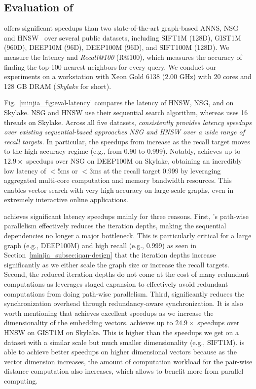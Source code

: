 \subsection{Evaluation of \Hammer}
\label{minjia_subsec:iqan-eval}

\Hammer offers significant speedups than two state-of-the-art graph-based ANNS, NSG~\cite{NSGGithub,nsg} and HNSW~\cite{HNSWGithub,hnsw} over several public datasets, including SIFT1M (128D), GIST1M (960D), DEEP10M (96D), DEEP100M (96D), and SIFT100M (128D). We measure the latency and \emph{Recall@100} (R@100), which measures the accuracy of finding the top-100 nearest neighbors for every query.
We conduct our experiments on a workstation with Xeon Gold 6138 (2.00 GHz) with 20 cores and 128 GB DRAM (\emph{Skylake} for short). 

Fig.~\ref{minjia_fig:eval-latency} compares the latency of HNSW, NSG, and \Hammer on Skylake. NSG and HNSW use their sequential search algorithm, whereas \Hammer uses 16 threads on Skylake. Across all five datasets, \emph{\Hammer consistently provides latency speedups over existing sequential-based approaches NSG and HNSW over a wide range of recall targets. }
In particular, the speedups from \Hammer increase as the recall target moves to the high accuracy regime (e.g., from 0.90 to 0.999).
Notably, \Hammer achieves up to $12.9\times$ speedups over NSG on DEEP100M on Skylake, obtaining an incredibly low latency of $<$5ms or $<$3ms at the recall target 0.999 by leveraging aggregated multi-core computation and memory bandwidth resources. This enables vector search with very high accuracy on large-scale graphs, even in extremely interactive online applications. 

\Hammer achieves significant latency speedups mainly for three reasons. First, \Hammer's path-wise parallelism effectively reduces the iteration depths, making the sequential dependencies no longer a major bottleneck. This is particularly critical for a large graph (e.g., DEEP100M) and high recall (e.g., 0.999) as seen in Section~\ref{minjia_subsec:iqan-design} that the iteration depths increase significantly as we either scale the graph size or increase the recall targets. 
Second, the reduced iteration depths do not come at the cost of many redundant computations as \Hammer leverages staged expansion to effectively avoid redundant computations from doing path-wise parallelism. Third, \Hammer significantly reduces the synchronization overhead through redundancy-aware synchronization.
It is also worth mentioning that \Hammer achieves excellent speedups as we increase the dimensionality of the embedding vectors. \Hammer achieves up to $24.9\times$ speedups over HNSW on GIST1M on Skylake. This is higher than the speedups we get on a dataset with a similar scale but much smaller dimensionality (e.g., SIFT1M). \Hammer is able to achieve better speedups on higher dimensional vectors because as the vector dimension increases, the amount of computation workload for the pair-wise distance computation also increases, which allows \Hammer to benefit more from parallel computing. 

